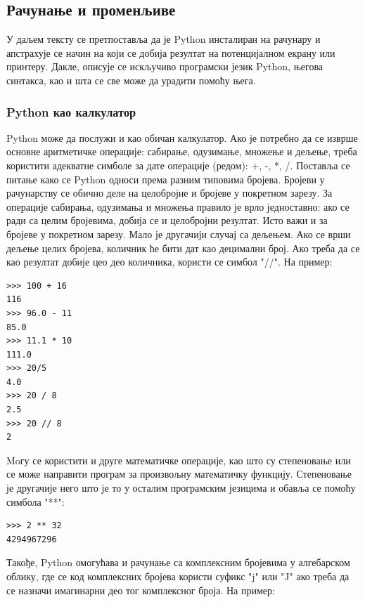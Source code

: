 \subsection{Рачунање и променљиве}

У даљем тексту се претпоставља да је Python инсталиран на рачунару и апстрахује се начин на који се добија резултат на потенцијалном екрану или принтеру. Дакле, описује се искључиво програмски језик Python, његова синтакса, као и шта се све може да урадити помоћу њега.

\subsubsection{Python као калкулатор}

Python може да послужи и као обичан калкулатор\cite{van2003introduction,lutz2009learning}. Ако је потребно да се изврше основне аритметичке операције: сабирање, одузимање, множење и дељење, треба користити адекватне симболе за дате операције (редом): +, -, *, /. Поставља се питање како се Python односи према разним типовима бројева. Бројеви у рачунарству се обично деле на целобројне и бројеве у покретном зарезу. За операције сабирања, одузимања и множења правило је врло једноставно: ако се ради са целим бројевима, добија се и целобројни резултат. Исто важи и за бројеве у покретном зарезу. Мало је другачији случај са дељењем. Ако се врши дељење целих бројева, количник ће бити дат као децимални број. Ако треба да се као резултат добије цео део количника, користи се симбол "//". На пример:

\begin{lstlisting}[caption = Примери операција са бројевима, label = racun]
>>> 100 + 16
116
>>> 96.0 - 11
85.0
>>> 11.1 * 10
111.0
>>> 20/5
4.0
>>> 20 / 8
2.5
>>> 20 // 8
2
\end{lstlisting}

Moгу се користити и друге математичке операције, као што су степеновање или се може направити програм за произвољну математичку функцију. Степеновање је другачије него што је то у осталим програмским језицима и обавља се помоћу симбола "**":

\begin{lstlisting}[caption = Степеновање, label = stepen]
>>> 2 ** 32
4294967296
\end{lstlisting}

Такође, Python омогућава и рачунање са комплексним бројевима у алгебарском облику, где се код комплексних бројева користи суфикс "j" или "J" ако треба да се назначи имагинарни део тог комплексног броја. На пример:

